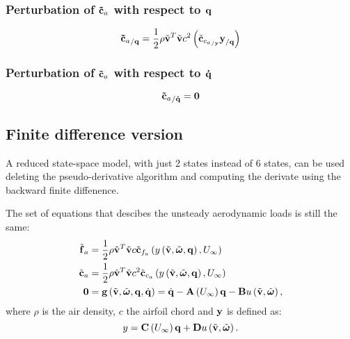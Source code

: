 \subsubsection{Perturbation of $\bm{\mathbf{\tilde{c}}}_a$ with respect to $\bm{\mathbf{q}}$}
\begin{equation}
{\bm{\mathbf{\tilde{c}}}_a}_{/\bm{\mathbf{q}}} = 
	\frac{1}{2} \rho \tilde{\bm{\mathbf{v}}}^T \tilde{\bm{\mathbf{v}}} c^2
	\left(  \tilde{\bm{\mathbf{c}}}_{{c_{a}}_{/\bm{\mathbf{y}}}} \bm{\mathbf{y}}_{/\bm{\mathbf{q}}}  \right) 
\end{equation}
\subsubsection{Perturbation of $\bm{\mathbf{\tilde{c}}}_a$ with respect to $\bm{\mathbf{\dot{q}}}$}
\begin{equation}
{\bm{\mathbf{\tilde{c}}}_a}_{/\bm{\mathbf{\dot{q}}}} = \bm{\mathbf{0}}
\end{equation}

\subsection{Finite difference version}

A reduced state-space model, with just 2 states instead of 6 states, can be
used deleting the pseudo-derivative algorithm and computing the derivate using
the backward finite diffenence.

The set of equations that descibes the unsteady aerodynamic loads is still the same:
\begin{subequations}
\begin{align}
	\tilde{\bm{\mathbf{f}}}_a &= 
		\frac{1}{2} \rho \tilde{\bm{\mathbf{v}}}^T \tilde{\bm{\mathbf{v}}} c
		\tilde{\bm{\mathbf{c}}}_{f_{a}}
		\left(  y 
		\left(  \tilde{\bm{\mathbf{v}}}, \tilde{\bm{\mathbf{\omega}}}, \bm{\mathbf{q}} \right), U_\infty \right)\\
	\tilde{\bm{\mathbf{c}}}_a &= 
		\frac{1}{2} \rho \tilde{\bm{\mathbf{v}}}^T \tilde{\bm{\mathbf{v}}} c^2
		\tilde{\bm{\mathbf{c}}}_{c_{a}} 
		\left(  y 
		\left(  \tilde{\bm{\mathbf{v}}}, \tilde{\bm{\mathbf{\omega}}}, \bm{\mathbf{q}} \right), U_\infty \right)\\
	\bm{\mathbf{0}} &=
		\bm{\mathbf{g}}\left( \tilde{\bm{\mathbf{v}}},\tilde{\bm{\mathbf{\omega}}},\bm{\mathbf{q}}, \dot{\bm{\mathbf{q}}} \right) = 
		\dot{\bm{\mathbf{q}}} - \bm{\mathbf{A}}\left( U_\infty \right) \bm{\mathbf{q}} - \bm{\mathbf{B}}
 		u\left( \tilde{\bm{\mathbf{v}}}, \tilde{\bm{\mathbf{\omega}}} \right),
\end{align}
\end{subequations}
where $\rho$ is the air density, $c$ the airfoil chord and $\bm{\mathbf{y}}$ is defined as:
\begin{equation}
	y = \bm{\mathbf{C}}\left( U_\infty \right) \bm{\mathbf{q}} + \bm{\mathbf{D}} 
 		u\left( \tilde{\bm{\mathbf{v}}}, \tilde{\bm{\mathbf{\omega}}} \right).
\end{equation}

